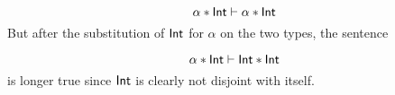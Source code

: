 \[
  \alpha * \textsf{Int} \vdash \alpha * \textsf{Int}
\]
But after the substitution of $\textsf{Int}$ for $\alpha$ on the two types, the sentence

\[
  \alpha * \textsf{Int} \vdash \textsf{Int} * \textsf{Int}
\]
is longer true since $\textsf{Int}$ is clearly not disjoint with itself.

%
%
%

%
%
%
%
%
%
%

